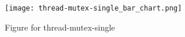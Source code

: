 \begin{figure}[H]
\centering
\texttt{[image: thread-mutex-single\_bar\_chart.png]}
\caption{Figure for thread-mutex-single}
\end{figure}
